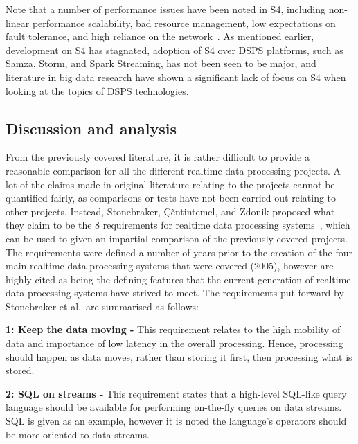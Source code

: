Note that a number of performance issues have been noted in S4, including non-linear performance scalability, bad
resource management, low expectations on fault tolerance, and high reliance on the network~\cite{chauhan2012performance}.
As mentioned earlier, development on S4 has stagnated, adoption of S4 over DSPS platforms, such as Samza, Storm,
and Spark Streaming, has not been seen to be major, and literature in big data research have shown a significant lack of
focus on S4 when looking at the topics of DSPS technologies.



\subsection{Discussion and analysis} %
\label{sub:processing_conclusion}

From the previously covered literature, it is rather difficult to provide a reasonable comparison for all the different
realtime data processing projects. A lot of the claims made in original literature relating to the projects cannot be
quantified fairly, as comparisons or tests have not been carried out relating to other projects. Instead, Stonebraker,
\c{C}\~entintemel, and Zdonik proposed what they claim to be the 8 requirements for realtime data processing systems~\cite{stonebraker_8_2005},
which can be used to given an impartial comparison of the previously covered projects. The requirements were defined a
number of years prior to the creation of the four main realtime data processing systems that were covered (2005), however are highly
cited as being the defining features that the current generation of realtime data processing systems have strived to meet.
The requirements put forward by Stonebraker et al.\ are summarised as follows:

\noindent \textbf{1: Keep the data moving -} This requirement relates to the high mobility of data and importance of low
latency in the overall processing. Hence, processing should happen as data moves, rather than storing it first, then
processing what is stored.

\noindent \textbf{2: SQL on streams -} This requirement states that a high-level SQL-like query language should be
available for performing on-the-fly queries on data streams. SQL is given as an example, however it is noted the language's
operators should be more oriented to data streams.

